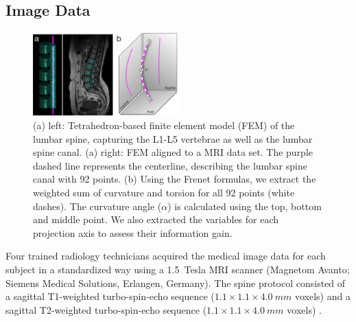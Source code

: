 \documentclass[a4paper,twoside]{style/article}
\begin{document}
\subsection{Image Data}
\begin{figure}[!h]
  \centering
  \includegraphics[width=0.5\textwidth]{figures/centerline}
  \caption{
	(a) left: Tetrahedron-based finite element model (FEM) of the lumbar spine, capturing the L1-L5 vertebrae as well as the lumbar spine canal.
	(a) right: FEM aligned to a MRI data set.
	The purple dashed line represents the centerline, describing the lumbar spine canal with 92 points.
	(b) Using the Frenet formulas, we extract the weighted sum of curvature and torsion for all 92 points (white dashes).
	The curvature angle ($\alpha$) is calculated using the top, bottom and middle point.
	We also extracted the variables for each projection axis to assess their information gain.
	}
  \label{fig:centerline}
\end{figure}
Four trained radiology technicians acquired the medical image data for each subject in a standardized way using a 1.5~Tesla MRI scanner (Magnetom Avanto; Siemens Medical Solutions, Erlangen, Germany).
The spine protocol consisted of a sagittal T1-weighted turbo-spin-echo sequence ($1.1\times1.1\times4.0~mm$ voxels) and a sagittal T2-weighted turbo-spin-echo sequence ($1.1\times1.1\times4.0~mm$ voxels) \cite{Hegenscheid2013}.
\end{document}
